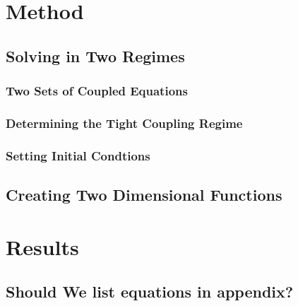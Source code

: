 \documentclass[10pt,a4paper]{article}
\begin{document}
\section{Method}
\label{sec:Method}

\subsection{Solving in Two Regimes}
\label{subsec:Method/Solving in two regimes}

    \subsubsection{Two Sets of Coupled Equations}
    \label{subsubsec:Method/Two ODE systems}

    \subsubsection{Determining the Tight Coupling Regime}
    \label{subsubsec:Method/Determine TC}

    \subsubsection{Setting Initial Condtions}
    \label{subsubsec:Method/setting initial conditions}

\subsection{Creating Two Dimensional Functions}
\label{subsec:Method/2D functions}

\section{Results}
\label{sec:Results}





\clearpage
\begin{appendices}
    \appendix
    \section{Should We list equations in appendix?}
\end{appendices}
\end{document}
